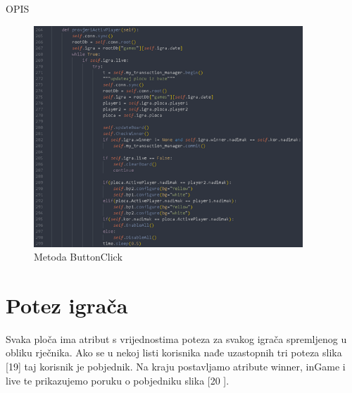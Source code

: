 \documentclass[]{foi} %
\begin{document}
OPIS

\begin{figure}[]
    \centering
    \includegraphics[width=0.9\textwidth]{slike/impl_9.png}
    \caption{Metoda ButtonClick \cite{Vlastita izrada}}
    \label{fig:podjela}
\end{figure}




\section{Potez igrača}

Svaka ploča ima atribut s vrijednostima poteza za svakog igrača spremljenog u obliku rječnika. Ako se u nekoj listi korisnika nađe uzastopnih tri poteza slika [19] taj korisnik je pobjednik.  Na kraju postavljamo atribute winner, inGame i live te prikazujemo poruku o pobjedniku slika [20 ].
\end{document}
